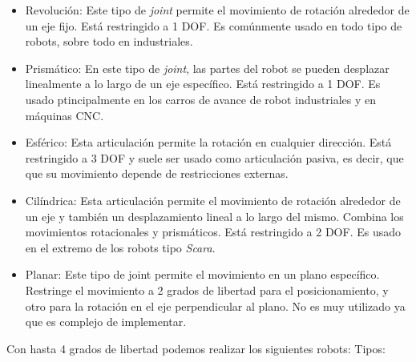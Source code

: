 \begin{itemize}
\item Revolución: Este tipo de \textit{joint} permite el movimiento de rotación alrededor de un eje fijo. Está restringido a 1 DOF. Es comúnmente usado en todo tipo de robots, sobre todo en industriales.
\item Prismático: En este tipo de \textit{joint}, las partes del robot se pueden desplazar linealmente a lo largo de un eje específico. Está restringido a 1 DOF. Es usado ptincipalmente en 
los carros de avance de robot industriales y en máquinas CNC.
\item Esférico: Esta articulación permite la rotación en cualquier dirección. Está restringido a 3 DOF y suele ser usado como articulación pasiva, es decir, que 
que su movimiento depende de restricciones externas.
\item Cilíndrica: Esta articulación permite el movimiento de rotación alrededor de un eje y también un desplazamiento lineal a lo largo del mismo. Combina los movimientos rotacionales y prismáticos. Está restringido a 2 DOF. Es usado en el extremo de los 
robots tipo \textit{Scara}.
\item Planar: Este tipo de joint permite el movimiento en un plano específico. Restringe el movimiento a 2 grados de libertad para el posicionamiento, y otro 
para la rotación en el eje perpendicular al plano. No es muy utilizado ya que es complejo de implementar.
\end{itemize}


Con hasta 4 grados de libertad podemos realizar los siguientes robots:
Tipos:

